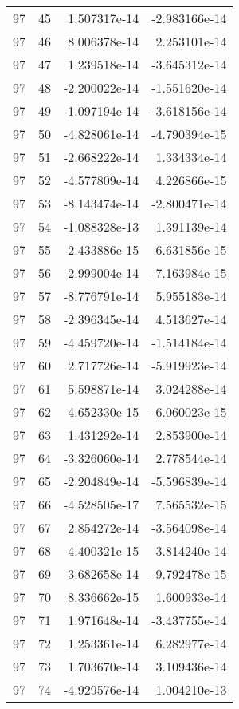 \begin{tabular}{rrrr}
  97 &   45 &  1.507317e-14 & -2.983166e-14 \\
  97 &   46 &  8.006378e-14 &  2.253101e-14 \\
  97 &   47 &  1.239518e-14 & -3.645312e-14 \\
  97 &   48 & -2.200022e-14 & -1.551620e-14 \\
  97 &   49 & -1.097194e-14 & -3.618156e-14 \\
  97 &   50 & -4.828061e-14 & -4.790394e-15 \\
  97 &   51 & -2.668222e-14 &  1.334334e-14 \\
  97 &   52 & -4.577809e-14 &  4.226866e-15 \\
  97 &   53 & -8.143474e-14 & -2.800471e-14 \\
  97 &   54 & -1.088328e-13 &  1.391139e-14 \\
  97 &   55 & -2.433886e-15 &  6.631856e-15 \\
  97 &   56 & -2.999004e-14 & -7.163984e-15 \\
  97 &   57 & -8.776791e-14 &  5.955183e-14 \\
  97 &   58 & -2.396345e-14 &  4.513627e-14 \\
  97 &   59 & -4.459720e-14 & -1.514184e-14 \\
  97 &   60 &  2.717726e-14 & -5.919923e-14 \\
  97 &   61 &  5.598871e-14 &  3.024288e-14 \\
  97 &   62 &  4.652330e-15 & -6.060023e-15 \\
  97 &   63 &  1.431292e-14 &  2.853900e-14 \\
  97 &   64 & -3.326060e-14 &  2.778544e-14 \\
  97 &   65 & -2.204849e-14 & -5.596839e-14 \\
  97 &   66 & -4.528505e-17 &  7.565532e-15 \\
  97 &   67 &  2.854272e-14 & -3.564098e-14 \\
  97 &   68 & -4.400321e-15 &  3.814240e-14 \\
  97 &   69 & -3.682658e-14 & -9.792478e-15 \\
  97 &   70 &  8.336662e-15 &  1.600933e-14 \\
  97 &   71 &  1.971648e-14 & -3.437755e-14 \\
  97 &   72 &  1.253361e-14 &  6.282977e-14 \\
  97 &   73 &  1.703670e-14 &  3.109436e-14 \\
  97 &   74 & -4.929576e-14 &  1.004210e-13 \\

\end{tabular}
